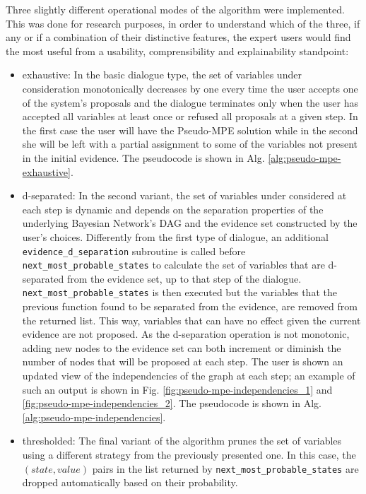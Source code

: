Three slightly different operational modes of the algorithm were implemented.
This was done for research purposes, in order to understand which of the three, if any or if a combination of their distinctive features, the expert users would find the most useful from a usability, comprensibility and explainability standpoint:
\begin{itemize}
  \item exhaustive: In the basic dialogue type, the set of variables under consideration monotonically decreases by one every time the user accepts one of the system's proposals and the dialogue terminates only when the user has accepted all variables at least once or refused all proposals at a given step.
	In the first case the user will have the Pseudo-MPE solution while in the second she will be left with a partial assignment to some of the variables not present in the initial evidence.
	The pseudocode is shown in Alg. \ref{alg:pseudo-mpe-exhaustive}.
  \item d-separated: In the second variant, the set of variables under considered at each step is dynamic and depends on the separation properties of the underlying Bayesian Network's DAG and the evidence set constructed by the user's choices.
  	Differently from the first type of dialogue, an additional \texttt{evidence\_d\_separation} subroutine is called before \texttt{next\_most\_probable\_states} to calculate the set of variables that are d-separated from the evidence set, up to that step of the dialogue.
  	\texttt{next\_most\_probable\_states} is then executed but the variables that the previous function found to be separated from the evidence, are removed from the returned list.
  	This way, variables that can have no effect given the current evidence are not proposed.
  	As the d-separation operation is not monotonic, adding new nodes to the evidence set can both increment or diminish the number of nodes that will be proposed at each step.
  	The user is shown an updated view of the independencies of the graph at each step; an example of such an output is shown in Fig. \ref{fig:pseudo-mpe-independencies_1} and \ref{fig:pseudo-mpe-independencies_2}.
  	The pseudocode is shown in Alg. \ref{alg:pseudo-mpe-independencies}.
  \item thresholded: The final variant of the algorithm prunes the set of variables using a different strategy from the previously presented one.
  	In this case, the $(state,value)$ pairs in the list returned by \texttt{next\_most\_probable\_states} are dropped automatically based on their probability.

\end{itemize}
